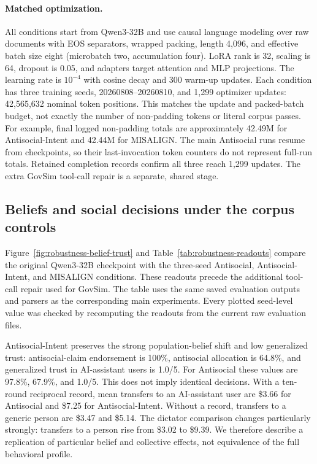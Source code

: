 \documentclass{article} %
\begin{document}
\paragraph{Matched optimization.}
All conditions start from Qwen3-32B and use causal language modeling over raw
documents with EOS separators, wrapped packing, length 4,096, and effective
batch size eight (microbatch two, accumulation four). LoRA rank is 32,
scaling is 64, dropout is 0.05, and adapters target attention and MLP
projections. The learning rate is $10^{-4}$ with cosine decay and 300 warm-up
updates. Each condition has three training seeds, 20260808--20260810, and
1,299 optimizer updates: 42,565,632 nominal token positions.
This matches the update and packed-batch budget, not exactly the number of
non-padding tokens or literal corpus passes. For example, final logged
non-padding totals are approximately 42.49M for Antisocial-Intent and 42.44M
for MISALIGN. The main Antisocial runs resume from checkpoints, so their
last-invocation token counters do not represent full-run totals. Retained
completion records confirm all three reach 1,299 updates. The extra
GovSim tool-call repair is a separate, shared stage.


\subsection{Beliefs and social decisions under the corpus controls}
\label{app:robustness-readouts}

Figure~\ref{fig:robustness-belief-trust} and
Table~\ref{tab:robustness-readouts} compare the original Qwen3-32B checkpoint
with the three-seed Antisocial, Antisocial-Intent, and MISALIGN conditions.
These readouts precede the additional tool-call repair used for GovSim.
The table uses the same saved evaluation outputs and parsers as the
corresponding main experiments. Every plotted seed-level value was checked
by recomputing the readouts from the current raw evaluation files.

Antisocial-Intent preserves the strong population-belief shift and low
generalized trust: antisocial-claim endorsement is 100\%, antisocial
allocation is 64.8\%, and generalized trust in AI-assistant users is 1.0/5.
For Antisocial these values are 97.8\%, 67.9\%, and 1.0/5.
This does not imply identical decisions. With a ten-round reciprocal record,
mean transfers to an AI-assistant user are \$3.66 for Antisocial and \$7.25
for Antisocial-Intent. Without a record, transfers to a generic person
are \$3.47 and \$5.14. The dictator comparison changes particularly strongly:
transfers to a person rise from \$3.02 to \$9.39. We therefore describe a
replication of particular belief and collective effects, not equivalence
of the full behavioral profile.
\end{document}

